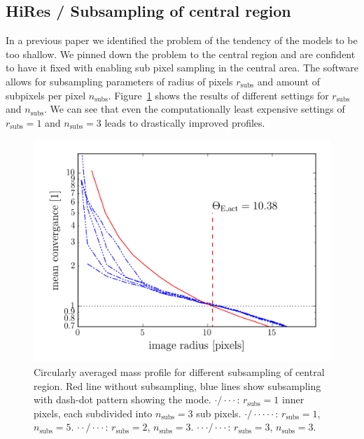 \documentclass[fleqn,usenatbib]{mnras}
\newcommand{\figref}[1]{\ref{fig:#1}}
\begin{document}
\subsection{HiRes / Subsampling of central region}
In a previous paper \cite{2015MNRAS.447.2170K} we identified the problem of the tendency of the models to be too shallow.
We pinned down the problem to the central region and are confident to have it fixed with enabling sub pixel sampling in the central area.
The software allows for subsampling parameters of radius of pixels $r_\text{subs}$ and amount of subpixels per pixel $n_\text{subs}$.
Figure~\figref{subsampling} shows the results of different settings for $r_\text{subs}$ and $n_\text{subs}$.
We can see that even the computationally least expensive settings of $r_\text{subs}=1$ and $n_\text{subs}=3$ leads to drastically improved profiles.

\begin{figure}
  \includegraphics[width=\linewidth]{hires/007022_kappa_encl}
  \caption{
    Circularly averaged mass profile for different subsampling of central region.
    Red line without subsampling, blue lines show subsampling with dash-dot pattern showing the mode.
    $\cdot / \cdot \cdot \cdot$: $r_\text{subs}=1$ inner pixels, each subdivided into $n_\text{subs}=3$ sub pixels.
    $\cdot / \cdot \cdot \cdot \cdot \cdot$: $r_\text{subs}=1$, $n_\text{subs}=5$.
    $\cdot \cdot / \cdot \cdot \cdot $: $r_\text{subs}=2$, $n_\text{subs}=3$.
    $\cdot \cdot \cdot / \cdot \cdot \cdot $: $r_\text{subs}=3$, $n_\text{subs}=3$.
    }
  \label{fig:subsampling}
\end{figure}
\end{document}
